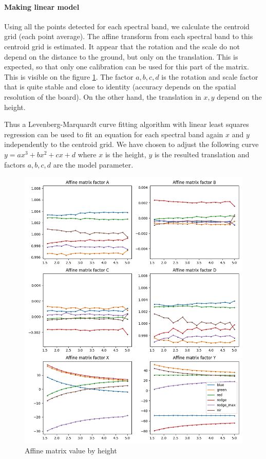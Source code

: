 \documentclass[]{elsarticle}
\begin{document}
	\paragraph{Making linear model}
	
	Using all the points detected for each spectral band, we calculate the centroid grid (each point average).
	The affine transform from each spectral band to this centroid grid is estimated.
	It appear that the rotation and the scale do not depend on the distance to the ground, but only on the translation.
	This is expected, so that only one calibration can be used for this part of the matrix.
	This is visible on the figure \ref{fig:affine-translation-height}.
	The factor $a,b,c,d$ is the rotation and scale factor that is quite stable and close to identity (accuracy depends on the spatial resolution of the board).
	On the other hand, the translation in $x, y$ depend on the height.
	
	Thus a Levenberg-Marquardt curve fitting algorithm with linear least squares regression \cite{More78}
	can be used to fit an equation for each spectral band again $x$ and $y$ independently to the centroid grid.
	We have chosen to adjust the following curve $y = ax^3 + bx^2 + cx + d$ where $x$ is the height,
	$y$ is the resulted translation and factors $a,b,c,d$ are the model parameter.
	
	\begin{figure}[!htb]
		\centering
		\includegraphics[width=\linewidth]{../figures/affine-translation-height.png}
		\caption{Affine matrix value by height}
		\label{fig:affine-translation-height}
	\end{figure}
	
\end{document}
